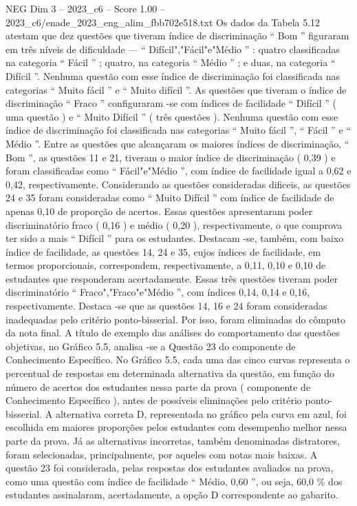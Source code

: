 \begin{textsample}{NEG Dim 3 – 2023\_c6 – Score 1.00 – 2023\_c6/enade\_2023\_eng\_alim\_fbb702e518.txt}
Os dados da Tabela 5.12 atestam que dez questões que tiveram índice de discriminação “ Bom ” figuraram em três níveis de dificuldade — “ Difícil","Fácil"e"Médio ” : quatro classificadas na categoria “ Fácil ” ; quatro, na categoria “ Médio ” ; e duas, na categoria “ Difícil ”.
Nenhuma questão com esse índice de discriminação foi classificada nas categorias “ Muito fácil ” e “ Muito difícil ”.
As questões que tiveram o índice de discriminação “ Fraco ” configuraram -se com índices de facilidade “ Difícil ” ( uma questão ) e “ Muito Difícil ” ( três questões ).
Nenhuma questão com esse índice de discriminação foi classificada nas categorias “ Muito fácil ”, “ Fácil ” e “ Médio ”.
Entre as questões que alcançaram os maiores índices de discriminação, “ Bom ”, as questões 11 e 21, tiveram o maior índice de discriminação ( 0,39 ) e foram classificadas como “ Fácil"e"Médio ”, com índice de facilidade igual a 0,62 e 0,42, respectivamente.
Considerando as questões consideradas dificeis, as questões 24 e 35 foram consideradas como “ Muito Difícil ” com índice de facilidade de apenas 0,10 de proporção de acertos.
Essas questões apresentaram poder discriminatório fraco ( 0,16 ) e médio ( 0,20 ), respectivamente, o que comprova ter sido a mais “ Difícil ” para os estudantes.
Destacam -se, também, com baixo índice de facilidade, as questões 14, 24 e 35, cujos índices de facilidade, em termos proporcionais, correspondem, respectivamente, a 0,11, 0,10 e 0,10 de estudantes que responderam acertadamente.
Essas três questões tiveram poder discriminatório “ Fraco","Fraco"e"Médio ”, com índices 0,14, 0,14 e 0,16, respectivamente.
Destaca -se que as questões 14, 16 e 24 foram consideradas inadequadas pelo critério ponto-bisserial.
Por isso, foram eliminadas do cômputo da nota final.
A título de exemplo das análises do comportamento das questões objetivas, no Gráfico 5.5, analisa -se a Questão 23 do componente de Conhecimento Específico.
No Gráfico 5.5, cada uma das cinco curvas representa o percentual de respostas em determinada alternativa da questão, em função do número de acertos dos estudantes nessa parte da prova ( componente de Conhecimento Específico ), antes de possíveis eliminações pelo critério ponto-bisserial.
A alternativa correta D, representada no gráfico pela curva em azul, foi escolhida em maiores proporções pelos estudantes com desempenho melhor nessa parte da prova.
Já as alternativas incorretas, também denominadas distratores, foram selecionadas, principalmente, por aqueles com notas mais baixas.
A questão 23 foi considerada, pelas respostas dos estudantes avaliados na prova, como uma questão com índice de facilidade “ Médio, 0,60 ”, ou seja, 60,0 \% dos estudantes assinalaram, acertadamente, a opção D correspondente ao gabarito.

\end{textsample}
